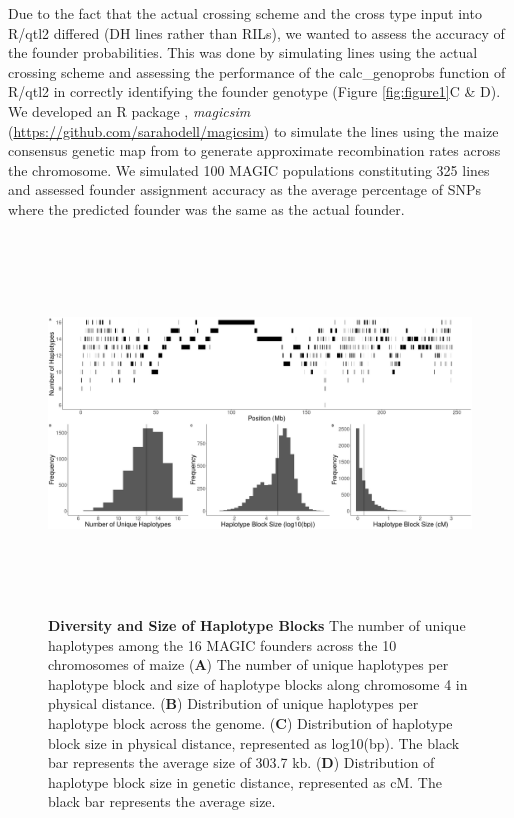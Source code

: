 \documentclass[article,9pt,twocolumn,twoside]{rilabRxiv}
\begin{document}
Due to the fact that the actual crossing scheme and the cross type input into R/qtl2 differed (DH lines rather than RILs), we wanted to assess the accuracy of the founder probabilities.
This was done by simulating lines using the actual crossing scheme and assessing the performance of the calc\_genoprobs function of R/qtl2 in correctly identifying the founder genotype (Figure \ref{fig:figure1}C \& D).
We developed an R package \citep{R}, \emph{magicsim} (\url{https://github.com/sarahodell/magicsim}) to simulate the lines using the maize consensus genetic map from \citep{Ogut} to generate approximate recombination rates across the chromosome.
We simulated 100 MAGIC populations constituting 325 lines and assessed founder assignment accuracy as the average percentage of SNPs where the predicted founder was the same as the actual founder.



\begin{figure}[ht]
\includegraphics[width=\textwidth,height=10cm]{figures/figure2.png}
\caption{\textbf{Diversity and Size of Haplotype Blocks} The number of unique haplotypes among the 16 MAGIC founders across the 10 chromosomes of maize (\textbf{A}) The number of unique haplotypes per haplotype block and size of haplotype blocks along chromosome 4 in physical distance. (\textbf{B}) Distribution of unique haplotypes per haplotype block across the genome. (\textbf{C}) Distribution of haplotype block size in physical distance, represented as log10(bp). The black bar represents the average size of 303.7 kb. (\textbf{D}) Distribution of haplotype block size in genetic distance, represented as cM. The black bar represents the average size.}
\label{fig:figure2}
\end{figure}
\end{document}
